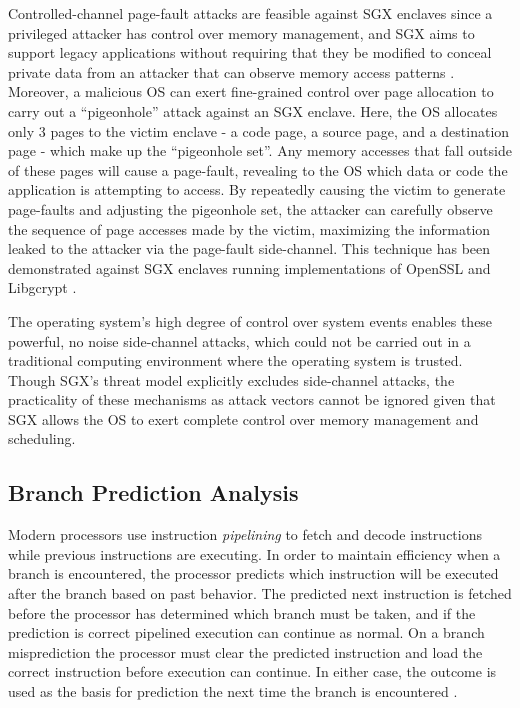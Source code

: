 Controlled-channel page-fault attacks are feasible against SGX enclaves since a privileged attacker has control over memory management, and SGX aims to support legacy applications without requiring that they be modified to conceal private data from an attacker that can observe memory access patterns \cite{xu_controlled-channel_2015}. Moreover, a malicious OS can exert fine-grained control over page allocation to carry out a ``pigeonhole'' attack against an SGX enclave. Here, the OS allocates only 3 pages to the victim enclave - a code page, a source page, and a destination page - which make up the ``pigeonhole set''. Any memory accesses that fall outside of these pages will cause a page-fault, revealing to the OS which data or code the application is attempting to access. By repeatedly causing the victim to generate page-faults and adjusting the pigeonhole set, the attacker can carefully observe the sequence of page accesses made by the victim, maximizing the information leaked to the attacker via the page-fault side-channel. This technique has been demonstrated against SGX enclaves running implementations of OpenSSL and Libgcrypt \cite{shinde_preventing_2015}. 

The operating system's high degree of control over system events enables these powerful, no noise side-channel attacks, which could not be carried out in a traditional computing environment where the operating system is trusted. Though SGX's threat model explicitly excludes side-channel attacks, the practicality of these mechanisms as attack vectors cannot be ignored given that SGX allows the OS to exert complete control over memory management and scheduling.

\subsection{Branch Prediction Analysis}

Modern processors use instruction \emph{pipelining} to fetch and decode instructions while previous instructions are executing. In order to maintain efficiency when a branch is encountered, the processor predicts which instruction will be executed after the branch based on past behavior. The predicted next instruction is fetched before the processor has determined which branch must be taken, and if the prediction is correct pipelined execution can continue as normal. On a branch misprediction the processor must clear the predicted instruction and load the correct instruction before execution can continue. In either case, the outcome is used as the basis for prediction the next time the branch is encountered \cite{aciicmez_power_2007, lee_inferring_2017}. 

